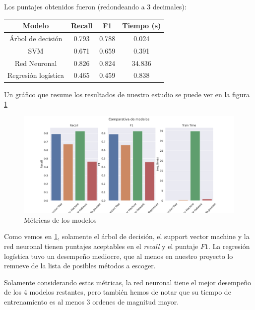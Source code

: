 \documentclass[journal]{IEEEtran}                                                          %
\begin{document}
        Los puntajes obtenidos fueron (redondeando a 3 decimales):
        
        \begin{center}
            \begin{tabular}{ |c|c|c|c| }
                \hline
                Modelo & Recall & F1 & Tiempo (s) \\
                \hline
                Árbol de decisión & 0.793 & 0.788 & 0.024 \\
                \hline
                SVM & 0.671 & 0.659 & 0.391 \\
                \hline
                Red Neuronal & 0.826 & 0.824 & 34.836 \\
                \hline
                Regresión logística & 0.465 & 0.459 & 0.838 \\
                \hline
            \end{tabular}
        \end{center}

        Un gráfico que resume los resultados de nuestro estudio se puede ver en la figura \ref{comparison}

        \begin{figure}[!htb]
            \centering
            \includegraphics[scale=0.25]{../report/img/comparison-results.pdf}
            \caption{Métricas de los modelos}
            \label{comparison}
        \end{figure}

        Como vemos en \ref{comparison}, solamente el árbol de decisión, el support vector machine y la red neuronal tienen puntajes aceptables en el \emph{recall} y el puntaje $F1$. La regresión logística tuvo un desempeño mediocre, que al menos en nuestro proyecto lo remueve de la lista de posibles métodos a escoger.

        Solamente considerando estas métricas, la red neuronal tiene el mejor desempeño de los 4 modelos restantes, pero también hemos de notar que su tiempo de entrenamiento es al menos 3 ordenes de magnitud mayor.
\end{document}
